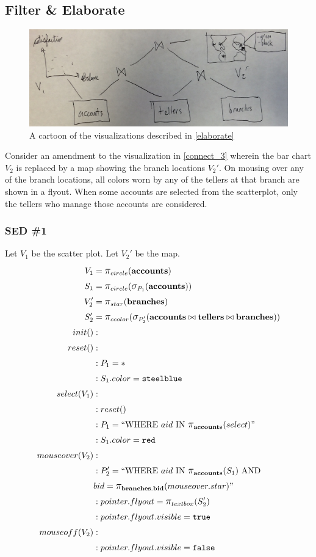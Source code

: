 \subsection{Filter \& Elaborate}\label{elaborate}
\begin{figure}[H]
	\includegraphics[width=\columnwidth]{figures/elaborate}
	\caption{A cartoon of the visualizations described in \autoref{elaborate}
	}
	\label{fig_elaborate}
\end{figure}
Consider an amendment to the visualization in \autoref{connect_3} wherein the bar chart $V_2$ is replaced by a map showing the branch locations $V_2'$.
On mousing over any of the branch locations, all colors worn by any of the tellers at that branch are shown in a flyout.
When some accounts are selected from the scatterplot, only the tellers who manage those accounts are considered.
\subsubsection{SED \#1}
Let $V_1$ be the scatter plot.
Let $V_2'$ be the map.
\begin{align*}
	V_1&= \mathlarger{\pi}_{circle}(\bf{accounts})\\
	S_1&= \mathlarger{\pi}_{circle}(\mathlarger{\sigma}_{P_1}(\bf{accounts}))\\
	V_2'&= \mathlarger{\pi}_{star}(\bf{branches})\\
	S_2'&= \mathlarger{\pi}_{ccolor}(\mathlarger{\sigma}_{P_2'}(\bf{accounts}\bowtie{}\bf{tellers}\bowtie{}\bf{branches}))\\
	init()&:\\
	reset()&:\\
	&: P_1 = *\\
	&: S_1.color = \texttt{steelblue}\\
	select(V_1)&:\\
	&: reset()\\
	&: P_1 = ``\text{WHERE}~aid~\text{IN}~\mathlarger{\pi}_{\bf{accounts}}(select)"\\
	&: S_1.color = \texttt{red}\\
	mouseover(V_2)&:\\
	&: P_2' = ``\text{WHERE}~aid~\text{IN}~\mathlarger{\pi}_{\bf{accounts}}(S_1)~\text{AND}\\&bid=\mathlarger{\pi}_{\bf{branches.bid}}(mouseover.star)"\\
	&: pointer.flyout = \mathlarger{\pi}_{textbox}(S_2')\\
	&: pointer.flyout.visible = \texttt{true}\\
	mouseoff(V_2)&:\\
	&: pointer.flyout.visible = \texttt{false}\\
\end{align*}
